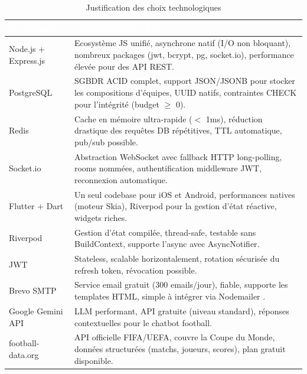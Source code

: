 \begin{table}[!htbp]
\centering
    \begin{tabularx}{\linewidth}{|l|X|}
        \hline
        \rowcolor{emsigreen}\textcolor{white}{\textbf{Technologie}} & \textcolor{white}{\textbf{Justification du choix}} \\
        \hline
        Node.js + Express.js \cite{nodejs} & Ecosystème JS unifié, asynchrone natif (I/O non bloquant), nombreux packages (jwt, bcrypt, pg, socket.io), performance élevée pour des API REST. \\
        \hline
        PostgreSQL \cite{postgresql} & SGBDR ACID complet, support JSON/JSONB pour stocker les compositions d'équipes, UUID natifs, contraintes CHECK pour l'intégrité (budget $\geq$ 0). \\
        \hline
        Redis \cite{redis} & Cache en mémoire ultra-rapide ($<$ 1ms), réduction drastique des requêtes DB répétitives, TTL automatique, pub/sub possible. \\
        \hline
        Socket.io \cite{socketio} & Abstraction WebSocket avec fallback HTTP long-polling, rooms nommées, authentification middleware JWT, reconnexion automatique. \\
        \hline
        Flutter + Dart \cite{flutter} & Un seul codebase pour iOS et Android, performances natives (moteur Skia), Riverpod pour la gestion d'état réactive, widgets riches. \\
        \hline
        Riverpod \cite{riverpod} & Gestion d'état compilée, thread-safe, testable sans BuildContext, supporte l'async avec AsyncNotifier. \\
        \hline
        JWT \cite{jwt} & Stateless, scalable horizontalement, rotation sécurisée du refresh token, révocation possible. \\
        \hline
        Brevo SMTP \cite{brevo} & Service email gratuit (300 emails/jour), fiable, supporte les templates HTML, simple à intégrer via Nodemailer \cite{nodemailer}. \\
        \hline
        Google Gemini API \cite{gemini} & LLM performant, API gratuite (niveau standard), réponses contextuelles pour le chatbot football. \\
        \hline
        football-data.org \cite{football_data} & API officielle FIFA/UEFA, couvre la Coupe du Monde, données structurées (matchs, joueurs, scores), plan gratuit disponible. \\
        \hline
    \end{tabularx}
\caption{Justification des choix technologiques}
\end{table}

